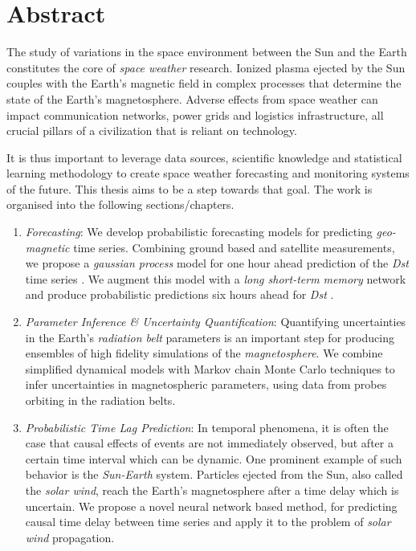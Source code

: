 \chapter*{Abstract}\label{chapter:abstract}

The study of variations in the space environment between the Sun and the Earth constitutes 
the core of \textit{space weather} research. Ionized plasma ejected by the Sun couples with 
the Earth’s magnetic field in complex processes that determine the state of the Earth's 
magnetosphere. Adverse effects from space weather can impact communication networks, 
power grids and logistics infrastructure, all crucial pillars of a civilization that 
is reliant on technology.

It is thus important to leverage data sources, scientific knowledge and statistical learning 
methodology to create space weather forecasting and monitoring systems of the future. This 
thesis aims to be a step towards that goal. The work is organised into the following 
sections/chapters.

\begin{enumerate}
\item \textit{Forecasting}: We develop probabilistic forecasting models for predicting 
\textit{geo-magnetic} time series. Combining ground based and satellite measurements, 
we propose a \textit{gaussian process} model for one hour ahead prediction of the \textit{Dst} 
time series \citep{ChandorkarDst,CHANDORKAR2018237}. We augment this model with a 
\textit{long short-term memory} network and produce probabilistic predictions six hours 
ahead for \textit{Dst} \citep{doi:10.1029/2018SW001898}.

\item \textit{Parameter Inference \& Uncertainty Quantification}: Quantifying uncertainties in the 
Earth's \textit{radiation belt} parameters is an important step for producing ensembles of high 
fidelity simulations of the \textit{magnetosphere}. We combine simplified dynamical models with 
Markov chain Monte Carlo techniques to infer uncertainties in magnetospheric parameters, 
using data from probes orbiting in the radiation belts.

\item \textit{Probabilistic Time Lag Prediction}: In temporal phenomena, it is often the case 
that causal effects of events are not immediately observed, but after a certain time interval 
which can be dynamic. One prominent example of such behavior is the \textit{Sun-Earth} system. 
Particles ejected from the Sun, also called the \textit{solar wind}, reach the Earth's magnetosphere 
after a time delay which is uncertain. We propose a novel neural network based method, for 
predicting causal time delay between time series and apply it to the problem of 
\textit{solar wind} propagation.

\end{enumerate}





